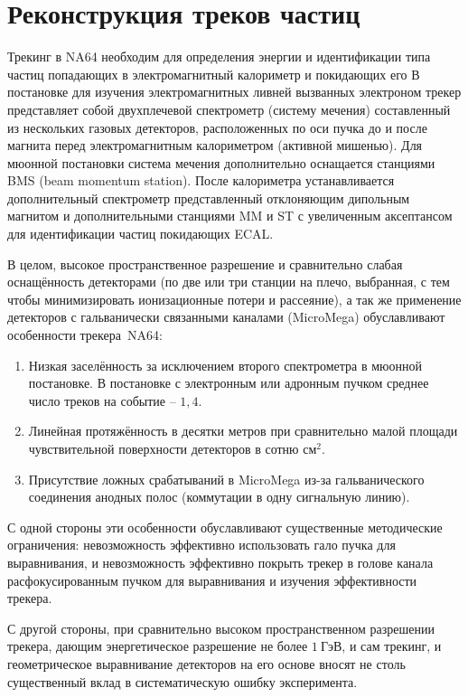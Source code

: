 \section{Реконструкция треков частиц}

Трекинг в NA64 необходим для определения энергии и идентификации типа частиц
попадающих в электромагнитный калориметр и покидающих его
В постановке для изучения электромагнитных ливней вызванных электроном трекер
представляет собой двухплечевой спектрометр (систему мечения) составленный
из нескольких газовых детекторов, расположенных по оси пучка до и после магнита
перед электромагнитным калориметром (активной мишенью).
Для мюонной постановки система мечения дополнительно оснащается станциями
BMS (beam momentum station). После калориметра устанавливается дополнительный
спектрометр представленный отклоняющим дипольным магнитом и дополнительными
станциями MM и ST с увеличенным аксептансом для идентификации частиц покидающих
ECAL.

В целом, высокое пространственное разрешение
и сравнительно слабая оснащённость детекторами (по две или три станции на плечо,
выбранная, с тем чтобы минимизировать ионизационные потери и рассеяние), а
так же применение детекторов с гальванически связанными каналами (MicroMega)
обуславливают особенности трекера~NA64:
\begin{enumerate}
    \item Низкая заселённость за исключением второго спектрометра в мюонной
    постановке. В постановке с электронным или адронным пучком среднее
    число треков на событие -- $1{,}4$.
    \item Линейная протяжённость в десятки метров при сравнительно малой площади
    чувствительной поверхности детекторов в сотню $\text{см}^2$.
    \item Присутствие ложных срабатываний в MicroMega из-за гальванического
    соединения анодных полос (коммутации в одну сигнальную линию).
\end{enumerate}

С одной стороны эти особенности обуславливают существенные методические
ограничения: невозможность эффективно использовать гало пучка для выравнивания,
и невозможность эффективно покрыть трекер в голове канала расфокусированным пучком
для выравнивания и изучения эффективности трекера.

С другой стороны, при сравнительно высоком пространственном разрешении
трекера, дающим энергетическое разрешение не более $1~\text{ГэВ}$,
и сам трекинг, и геометрическое выравнивание детекторов на его основе
вносят не столь существенный вклад в систематическую ошибку эксперимента.


